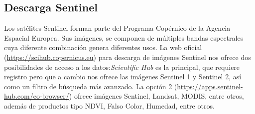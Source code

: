 \documentclass[a4paper,oneside,11pt,]{article}
\begin{document}
\subsection{Descarga Sentinel}

Los satélites Sentinel forman parte del Programa Copérnico de la Agencia Espacial Europea. Sus imágenes, se componen de múltiples bandas espectrales cuya diferente combinación genera diferentes usos.
La web oficial (\url{https://scihub.copernicus.eu}) para descarga de imágenes Sentinel nos ofrece dos posibilidades de acceso a los datos:\emph{Scientific Hub} es la principal, que requiere registro pero que a cambio nos ofrece las imágenes Sentinel 1 y Sentinel 2, así como un filtro de búsqueda más avanzado. La opción 2 (\url{https://apps.sentinel-hub.com/eo-browser/}) ofrece imágenes Sentinel, Landsat, MODIS, entre otros, además de productos tipo NDVI, Falso Color, Humedad, entre otros.
\end{document}
